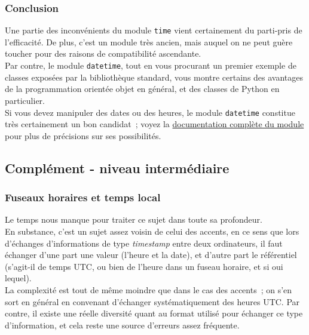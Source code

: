     \hypertarget{conclusion}{%
\subsubsection{Conclusion}\label{conclusion}}

    Une partie des inconvénients du module \texttt{time} vient certainement
du parti-pris de l'efficacité. De plus, c'est un module très ancien,
mais auquel on ne peut guère toucher pour des raisons de compatibilité
ascendante.\\

Par contre, le module \texttt{datetime}, tout en vous procurant un
premier exemple de classes exposées par la bibliothèque standard, vous
montre certains des avantages de la programmation orientée objet en
général, et des classes de Python en particulier.\\

Si vous devez manipuler des dates ou des heures, le module
\texttt{datetime} constitue très certainement un bon candidat~; voyez la
\href{https://docs.python.org/3/library/datetime.html}{documentation
complète du module} pour plus de précisions sur ses possibilités.

    \hypertarget{compluxe9ment---niveau-intermuxe9diaire}{%
\subsection{Complément - niveau
intermédiaire}\label{compluxe9ment---niveau-intermuxe9diaire}}

    \hypertarget{fuseaux-horaires-et-temps-local}{%
\subsubsection{Fuseaux horaires et temps
local}\label{fuseaux-horaires-et-temps-local}}

    Le temps nous manque pour traiter ce sujet dans toute sa profondeur.\\

En substance, c'est un sujet assez voisin de celui des accents, en ce
sens que lors d'échanges d'informations de type \emph{timestamp} entre
deux ordinateurs, il faut échanger d'une part une valeur (l'heure et la
date), et d'autre part le référentiel (s'agit-il de temps UTC, ou bien
de l'heure dans un fuseau horaire, et si oui lequel).\\

La complexité est tout de même moindre que dans le cas des accents~; on
s'en sort en général en convenant d'échanger systématiquement des heures
UTC. Par contre, il existe une réelle diversité quant au format utilisé
pour échanger ce type d'information, et cela reste une source d'erreurs
assez fréquente.

